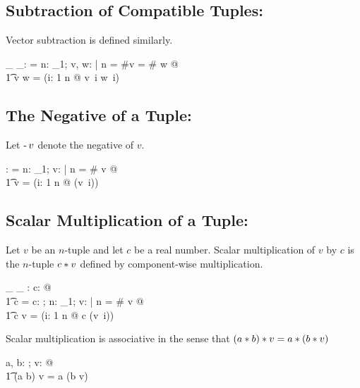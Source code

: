 \documentclass[11pt, oneside]{article}
\begin{document}
\subsection{Subtraction of Compatible Tuples: }

Vector subtraction is defined similarly.

\begin{axdef}
	\_ \subRinf \_: \RinfDelta \fun \Rinf
\where
	\langle \rangle \subRinf \langle \rangle = \langle \rangle
\also
\forall n: \nat_1; v, w: \Rinf | n = \#v = \# w @ \\
\t1	v \subRinf w = (\lambda i: 1 \upto n @ v~i \subR w~i)
\end{axdef}

\subsection{The Negative of a Tuple: }

Let $\operatorname{-} v$ denote the negative of $v$.

\begin{axdef}
\negRinf: \Rinf \fun \Rinf
\where
\negRinf \langle \rangle = \langle \rangle
\also
\forall n: \nat_1; v: \Rinf | n = \# v @ \\
\t1	\negRinf v = (\lambda i: 1 \upto n @ \negR(v~i))
\end{axdef}

\subsection{Scalar Multiplication of a Tuple: }

Let $v$ be an $n$-tuple and let $c$ be a real number.
Scalar multiplication of $v$ by $c$ is the $n$-tuple $c \mathbin{*} v$ defined by component-wise multiplication.

\begin{axdef}
\_ \smulRinf \_ : \R \cross \Rinf \fun \Rinf 
\where
\forall c: \R @ \\
\t1	c \smulRinf \langle \rangle = \langle \rangle
\also
\forall c: \R; n: \nat_1; v: \Rinf | n = \# v @ \\
\t1	c \smulRinf v = (\lambda i: 1 \upto n @ c \mulR (v~i))
\end{axdef}

\begin{remark}
Scalar multiplication is associative in the sense that $(a \mathbin{*} b) \mathbin{*} v = a \mathbin{*} (b \mathbin{*} v)$

\begin{zed}
	\forall a, b: \R; v: \Rinf @ \\
	\t1	(a \mulR b) \smulRinf v = a \smulRinf (b \smulRinf v)
\end{zed}

\end{remark}
\end{document}
